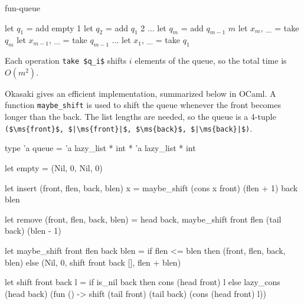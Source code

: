 \begin{exercise}{fun-queue}
\begin{answer}
\begin{ocaml}
let $q_1$ = add empty 1
let $q_2$ = add $q_1$ 2
...
let $q_m$ = add $q_{m - 1}$ $m$
let $x_m$, _ = take $q_m$
let $x_{m - 1}$, _ = take $q_{m - 1}$
...
let $x_1$, _ = take $q_1$
\end{ocaml}
%
Each operation \hbox{\lstinline/take $q_i$/} shifts $i$ elements of the queue, so the total time is $O(m^2)$.

Okasaki gives an efficient implementation, summarized below in OCaml.  A function
\hbox{\lstinline/maybe_shift/} is used to shift the queue whenever the front becomes longer than the back.
The list lengths are needed, so the queue is a 4-tuple
%
\hbox{\lstinline/($\ms{front}$, $|\ms{front}|$, $\ms{back}$, $|\ms{back}|$)/}.

\begin{ocaml}
type 'a queue = 'a lazy_list * int * 'a lazy_list * int

let empty = (Nil, 0, Nil, 0)

let insert (front, flen, back, blen) x =
   maybe_shift (cons x front) (flen + 1) back blen

let remove (front, flen, back, blen) =
   head back, maybe_shift front flen (tail back) (blen - 1)

let maybe_shift front flen back blen =
   if flen <= blen then
      (front, flen, back, blen)
   else
      (Nil, 0, shift front back [], flen + blen)

let shift front back l =
   if is_nil back then
      cons (head front) l
   else
      lazy_cons (head back) (fun () ->
         shift (tail front) (tail back) (cons (head front) l))
\end{ocaml}
\fi\end{answer}
\end{exercise}

